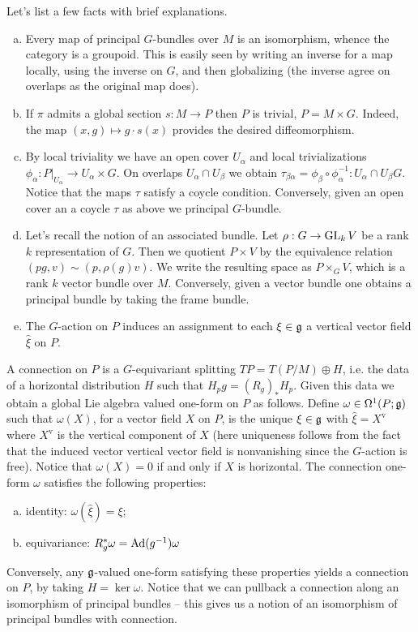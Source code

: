 \documentclass{amsart}
\begin{document}
Let's list a few facts with brief explanations.
\begin{enumerate}[(a)]
    \item Every map of principal $G$-bundles over $M$ is an isomorphism, whence the category
        is a groupoid. This is easily seen by writing an inverse for a map locally, using
        the inverse on $G$, and then globalizing (the inverse agree on overlaps as
        the original map does).
    \item If $\pi$ admits a global section $s:M\to P$ then $P$ is trivial, $P=M\times G$.
        Indeed, the map $(x,g)\mapsto g\cdot s(x)$ provides the desired diffeomorphism.
    \item By local triviality we have an open cover $U_\alpha$ and local trivializations
        $\phi_\alpha:P|_{U_\alpha}\to U_\alpha\times G$. On overlaps $U_\alpha\cap U_\beta$
        we obtain $\tau_{\beta\alpha}=\phi_\beta\circ\phi_\alpha^{-1}:U_\alpha\cap U_\beta G$.
        Notice that the maps $\tau$ satisfy a coycle condition. Conversely, given an
        open cover an a coycle $\tau$ as above we principal $G$-bundle.
    \item Let's recall the notion of an associated bundle. Let $\rho:G\to\operatorname{GL}_k V$ be a
        rank $k$ representation of $G$. Then we quotient $P\times V$ by the equivalence
        relation $(pg, v)\sim (p,\rho(g)v)$. We write the resulting space as $P\times_G V$,
        which is a rank $k$ vector bundle over $M$. Conversely, given a vector bundle
        one obtains a principal bundle by taking the frame bundle.
    \item The $G$-action on $P$ induces an assignment to each $\xi\in\mathfrak g$ a vertical
        vector field $\hat \xi$ on $P$.
\end{enumerate}

A connection on $P$ is a $G$-equivariant splitting $TP = T(P/M) \oplus H$, i.e. the data
of a horizontal distribution $H$ such that $H_pg=(R_g)_*H_p$. Given this data we obtain
a global Lie algebra valued one-form on $P$ as follows. Define $\omega\in\Omega^1(P; \mathfrak g)$
such that $\omega(X)$, for a vector field $X$ on $P$, is the unique $\xi\in\mathfrak g$
with $\hat\xi=X^\text{v}$ where $X^\text{v}$ is the vertical component of $X$ (here
uniqueness follows from the fact that the induced vector vertical vector field is
nonvanishing since the $G$-action is free).
Notice that $\omega(X)=0$ if and only if $X$ is horizontal.
The connection one-form $\omega$ satisfies the following properties:
\begin{enumerate}[(a)]
    \item identity: $\omega(\hat \xi) = \xi$;
    \item equivariance: $R_g^*\omega = \operatorname{Ad}(g^{-1})\omega$
\end{enumerate}
Conversely, any $\mathfrak g$-valued one-form satisfying these properties yields a connection
on $P$, by taking $H=\ker\omega$. Notice that we can pullback a connection along an
isomorphism of principal bundles -- this gives us a notion of an isomorphism of
principal bundles with connection.
\end{document}
